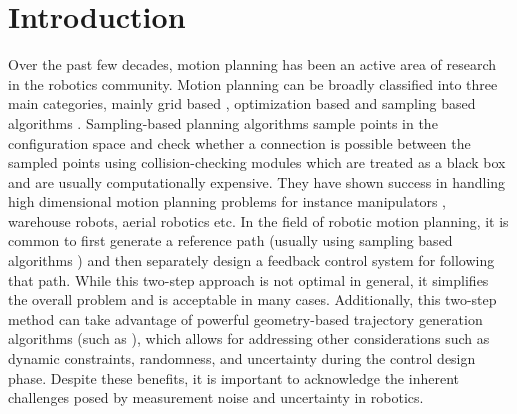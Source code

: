 \documentclass[Afour,sageh,times]{sagej}
\begin{document}
\section{Introduction}
Over the past few decades, motion planning has been an active area of research in the robotics community. Motion planning can be broadly classified into three main categories, mainly grid based \cite{ding2019efficient_hkust_search,MacAllister}, optimization based \cite{mercy2017spline_tcst,Kushleyev,Deits} and sampling based algorithms \cite{karaman2011sampling}. Sampling-based planning algorithms sample points in the configuration space and check whether a connection is possible between the sampled points using collision-checking modules which are treated as a black box and are usually computationally expensive. They have shown success in handling high dimensional motion planning problems for instance manipulators \cite{khan2020control_rrt_manipulator}, warehouse robots, aerial robotics \cite{lee2016planning_rrt_aerial} etc. In the field of robotic motion planning, it is common to first generate a reference path (usually using sampling based algorithms \cite{karaman2011sampling,hart1968formal_astar,kavraki1996probabilistic_prm,lavalle2001rapidly_rrt,janson2015fast_fmt,zinage2020generalized}) and then separately design a feedback control system for following that path. While this two-step approach is not optimal in general, it simplifies the overall problem and is acceptable in many cases. Additionally, this two-step method can take advantage of powerful geometry-based trajectory generation algorithms (such as \cite{hkust,upenn,mellinger,ding2019safe_hkust_optimization,zinage20233d}), which allows for addressing other considerations such as dynamic constraints, randomness, and uncertainty during the control design phase. Despite these benefits, it is important to acknowledge the inherent challenges posed by measurement noise and uncertainty in robotics.
\end{document}
